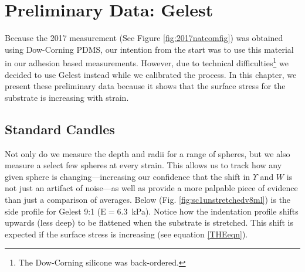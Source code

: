 \section{Preliminary Data: Gelest}
Because the 2017 measurement \cite{xu2017direct} (See Figure \ref{fig:2017natcomfig}) was obtained using Dow-Corning PDMS, our intention from the start was to use this material in our adhesion based measurements. However, due to technical difficulties\footnote{The Dow-Corning silicone was back-ordered.} we decided to use Gelest instead while we calibrated the process. In this chapter, we present these preliminary data because it shows that the surface stress for the substrate is increasing with strain.  

\subsection{Standard Candles}
Not only do we measure the depth and radii for a range of spheres, but we also measure a select few spheres at every strain. This allows us to track how any given sphere is changing---increasing our confidence that the shift in $\Upsilon$ and $ W $ is not just an artifact of noise---as well as provide a more palpable piece of evidence than just a comparison of averages. Below (Fig. \ref{fig:sc1unstretchedv8ml}) is the side profile for Gelest 9:1 ($\text{E}=6.3$~kPa). Notice how the indentation profile shifts upwards (less deep) to be flattened when the substrate is stretched. This shift is expected if the surface stress is increasing (see equation \ref{THEeqn}).

